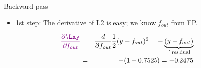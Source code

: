 \begin{vbframe}{Backward pass}
  \begin{itemize}
    \item 1st step: The derivative of L2 is easy; we know ${f_{out}}$ from FP.
  \end{itemize}
    \begin{eqnarray*}
      \textcolor{violet}{\frac{\partial \Lxy}{\partial f_{out}}} &=& \frac{d}{\partial f_{out}} \frac{1}{2}(y - f_{out})^2 = -\underbrace{(y - {f_{out}})}_{\hat{=} \text{residual}} \\
       &=& -(1 - \num[round-mode=places,round-precision=4]{0.7525469}) = \num[round-mode=places,round-precision=4]{-0.2474531}
    \end{eqnarray*}
    \begin{figure}
      \centering
    \end{figure}
\framebreak


\end{vbframe}
